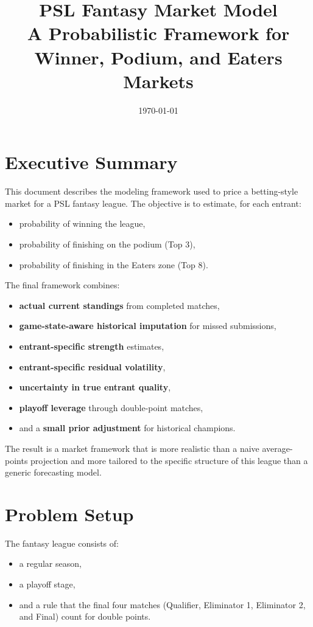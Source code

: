 \documentclass[11pt]{article}
\title{\vspace{-1em}\textbf{PSL Fantasy Market Model}\\
\large A Probabilistic Framework for Winner, Podium, and Eaters Markets}
\author{}
\date{\today}
\begin{document}
\maketitle
\vspace{-1.5em}

\section{Executive Summary}

This document describes the modeling framework used to price a betting-style market for a PSL fantasy league. The objective is to estimate, for each entrant:
\begin{itemize}[itemsep=2pt]
    \item probability of winning the league,
    \item probability of finishing on the podium (Top 3),
    \item probability of finishing in the Eaters zone (Top 8).
\end{itemize}

The final framework combines:
\begin{itemize}[itemsep=2pt]
    \item \textbf{actual current standings} from completed matches,
    \item \textbf{game-state-aware historical imputation} for missed submissions,
    \item \textbf{entrant-specific strength} estimates,
    \item \textbf{entrant-specific residual volatility},
    \item \textbf{uncertainty in true entrant quality},
    \item \textbf{playoff leverage} through double-point matches,
    \item and a \textbf{small prior adjustment} for historical champions.
\end{itemize}

The result is a market framework that is more realistic than a naive average-points projection and more tailored to the specific structure of this league than a generic forecasting model.

\section{Problem Setup}

The fantasy league consists of:
\begin{itemize}[itemsep=2pt]
    \item a regular season,
    \item a playoff stage,
    \item and a rule that the final four matches (Qualifier, Eliminator 1, Eliminator 2, and Final) count for double points.
\end{itemize}
\end{document}
